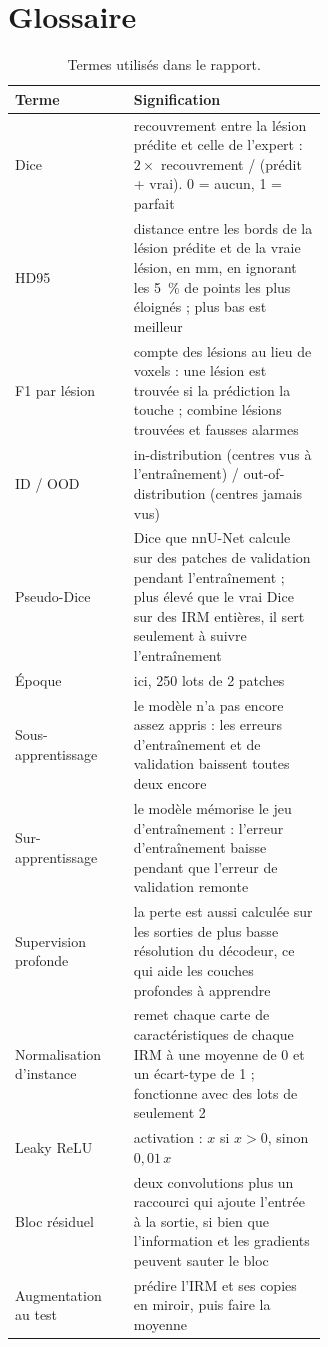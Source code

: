 
\chapter{Glossaire}
\label{chap:glossaire}

\begin{table}[htbp]
  \centering
  \caption{Termes utilisés dans le rapport.}
  \label{tab:glossaire}
  \small
  \begin{tabular}{lp{0.62\linewidth}}
    \toprule
    Terme & Signification \\
    \midrule
    Dice & recouvrement entre la lésion prédite et celle de l'expert : $2 \times$ recouvrement / (prédit + vrai). 0 = aucun, 1 = parfait \\
    HD95 & distance entre les bords de la lésion prédite et de la vraie lésion, en mm, en ignorant les 5~\% de points les plus éloignés ; plus bas est meilleur \\
    F1 par lésion & compte des lésions au lieu de voxels : une lésion est trouvée si la prédiction la touche ; combine lésions trouvées et fausses alarmes \\
    ID / OOD & in-distribution (centres vus à l'entraînement) / out-of-distribution (centres jamais vus) \\
    Pseudo-Dice & Dice que nnU-Net calcule sur des patches de validation pendant l'entraînement ; plus élevé que le vrai Dice sur des IRM entières, il sert seulement à suivre l'entraînement \\
    Époque & ici, 250 lots de 2 patches \\
    Sous-apprentissage & le modèle n'a pas encore assez appris : les erreurs d'entraînement et de validation baissent toutes deux encore \\
    Sur-apprentissage & le modèle mémorise le jeu d'entraînement : l'erreur d'entraînement baisse pendant que l'erreur de validation remonte \\
    Supervision profonde & la perte est aussi calculée sur les sorties de plus basse résolution du décodeur, ce qui aide les couches profondes à apprendre \\
    Normalisation d'instance & remet chaque carte de caractéristiques de chaque IRM à une moyenne de 0 et un écart-type de 1 ; fonctionne avec des lots de seulement 2 \\
    Leaky ReLU & activation : $x$ si $x > 0$, sinon $0{,}01\,x$ \\
    Bloc résiduel & deux convolutions plus un raccourci qui ajoute l'entrée à la sortie, si bien que l'information et les gradients peuvent sauter le bloc \\
    Augmentation au test & prédire l'IRM et ses copies en miroir, puis faire la moyenne \\
    \bottomrule
  \end{tabular}
\end{table}
